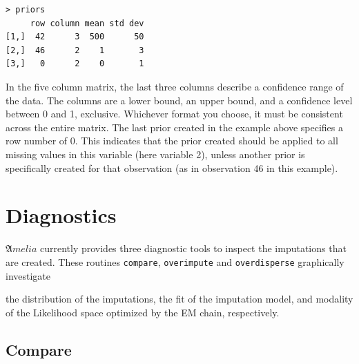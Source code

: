 \documentclass[12pt,titlepage]{article}
\newcommand{\Amelia}{\ensuremath{\mathfrak Amelia} }
\begin{document}
\begin{verbatim}
> priors
     row column mean std dev
[1,]  42      3  500      50
[2,]  46      2    1       3
[3,]   0      2    0       1
\end{verbatim}

In the five column matrix, the last three columns describe a
confidence range of the data. The columns are a lower bound, an upper
bound, and a confidence level between 0 and 1, exclusive.  Whichever
format you choose, it must be consistent across the entire matrix.
The last prior created in the example above specifies a row number of
0.  This indicates that the prior created should be applied to all
missing values in this variable (here variable 2), unless another
prior is specifically created for that observation (as in observation
46 in this example).

\section{Diagnostics}\label{sec:diag}

\Amelia currently provides three diagnostic tools to inspect the
imputations that are created.  These routines \texttt{compare},
\texttt{overimpute} and \texttt{overdisperse} graphically investigate

the distribution of the imputations, the fit of the imputation model,
and modality of the Likelihood space optimized by the EM chain,
respectively.

\subsection{Compare}
\end{document}
